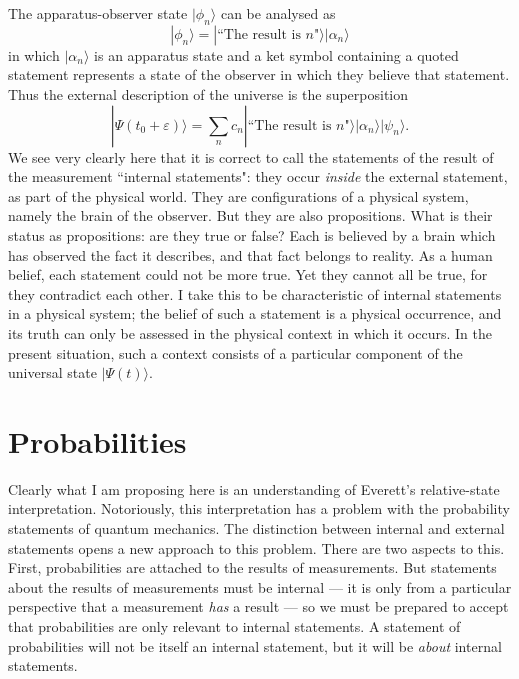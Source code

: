 \documentclass[12pt,a4paper,reqno]{article}
\renewcommand{\(}{\left(}
\renewcommand{\)}{\right)}
\renewcommand{\epsilon}{\varepsilon}
\newcommand{\<}{\langle}
\renewcommand{\>}{\rangle}
\theoremstyle{plain} %
\theoremstyle{definition}
\theoremstyle{remark}
\begin{document}
The apparatus-observer state $|\phi_n\>$ can be analysed as
\[
|\phi_n\> = |\text{``The result is $n$"}\>|\alpha_n\>
\]
in which $|\alpha_n\>$ is an apparatus state and a ket symbol containing
a quoted statement represents a state of the observer in which they
believe that statement. Thus the external description of the universe is
the superposition
\[
|\Psi(t_0+\epsilon)\> = 
\sum_n c_n |\text{``The result is $n$"}\>|\alpha_n\>|\psi_n\>.
\]
We see very clearly here that it is correct to call the statements of the result of the
measurement ``internal statements": they occur 
\emph{inside} the external statement, as part of the physical
world. They are configurations of a physical system, namely the brain of
the observer. But they are also propositions. What is their status as propositions:
are they true or false? Each is believed by a brain which has observed the fact it
describes, and that fact belongs to reality. As a
human belief, each statement could not be more true. Yet they cannot all
be true, for they contradict each other. I take this to be
characteristic of internal statements in a physical system; the
belief of such a statement is a physical occurrence, and its truth can
only be assessed in the physical context in which it occurs. In the
present situation, such a context consists of a particular component of
the universal state $|\Psi(t)\>$. 


\section{Probabilities}

Clearly what I am proposing here is an understanding of Everett's relative-state
interpretation. Notoriously, this interpretation has a problem with the
probability statements of quantum mechanics. The distinction between
internal and external statements opens a new approach to this problem.
There are two aspects to this. First, probabilities are attached to the
results of measurements. But statements about the results of measurements
must be internal --- it is only from a particular perspective that a
measurement \emph{has} a result --- so we must be prepared to accept
that probabilities are only relevant to internal statements. A statement
of probabilities will not be itself an internal statement, but it will
be \emph{about} internal statements.
\end{document}
